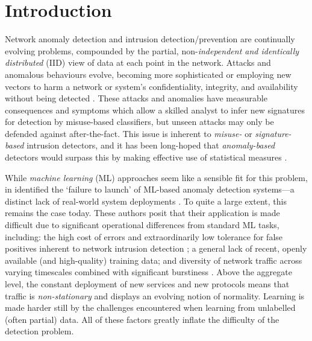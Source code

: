 \documentclass[10pt, times, comsoc]{IEEEtran}
\begin{document}
\section{Introduction}

Network anomaly detection and intrusion detection/prevention are continually evolving problems, compounded by the partial, non-\emph{independent and identically distributed} (IID) view of data at each point in the network.
Attacks and anomalous behaviours evolve, becoming more sophisticated or employing new vectors to harm a network or system's confidentiality, integrity, and availability without being detected \cite{DBLP:journals/comsur/BhuyanBK14}.
These attacks and anomalies have measurable consequences and symptoms which allow a skilled analyst to infer new signatures for detection by misuse-based classifiers, but unseen attacks may only be defended against after-the-fact.
This issue is inherent to \emph{misuse-} or \emph{signature-based} intrusion detectors, and it has been long-hoped that \emph{anomaly-based} detectors would surpass this by making effective use of statistical measures \cite{DBLP:journals/comsur/BhuyanBK14}.

While \emph{machine learning} (ML) approaches seem like a sensible fit for this problem, in \citeyear{DBLP:conf/sp/SommerP10} \citeauthor{DBLP:conf/sp/SommerP10} identified the `failure to launch' of ML-based anomaly detection systems---a distinct lack of real-world system deployments \cite{DBLP:conf/sp/SommerP10}.
To quite a large extent, this remains the case today.
These authors posit that their application is made difficult due to significant operational differences from standard ML tasks, including: the high cost of errors and extraordinarily low tolerance for false positives inherent to network intrusion detection \cite{DBLP:conf/ccs/Axelsson99}; a general lack of recent, openly available (and high-quality) training data; and diversity of network traffic across varying timescales combined with significant burstiness \cite{DBLP:journals/ccr/LelandWTW95}.
Above the aggregate level, the constant deployment of new services and new protocols means that traffic is \emph{non-stationary} and displays an evolving notion of normality.
Learning is made harder still by the challenges encountered when learning from unlabelled (often partial) data.
All of these factors greatly inflate the difficulty of the detection problem.

\end{document}
